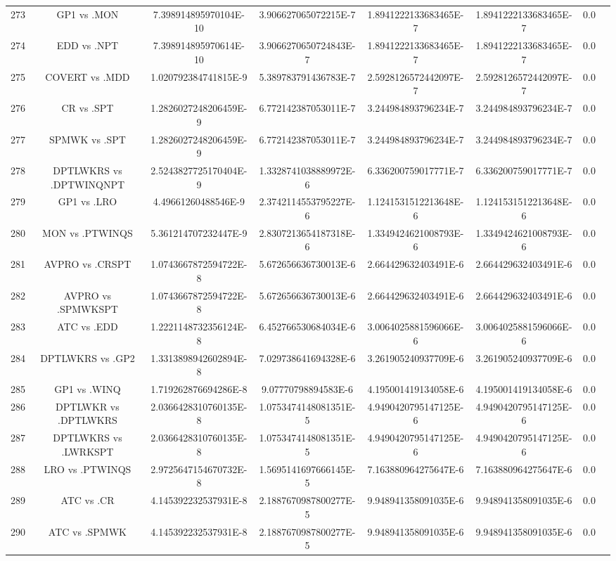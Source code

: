 \documentclass[a3paper,10pt]{article}
\begin{document}
\begin{table}[!htp]
\begin{tabular}{cccccccc}
273&GP1 vs .MON&7.398914895970104E-10&3.906627065072215E-7&1.8941222133683465E-7&1.8941222133683465E-7&0.0\\
274&EDD vs .NPT&7.398914895970614E-10&3.9066270650724843E-7&1.8941222133683465E-7&1.8941222133683465E-7&0.0\\
275&COVERT vs .MDD&1.020792384741815E-9&5.389783791436783E-7&2.5928126572442097E-7&2.5928126572442097E-7&0.0\\
276&CR vs .SPT&1.2826027248206459E-9&6.772142387053011E-7&3.244984893796234E-7&3.244984893796234E-7&0.0\\
277&SPMWK vs .SPT&1.2826027248206459E-9&6.772142387053011E-7&3.244984893796234E-7&3.244984893796234E-7&0.0\\
278&DPTLWKRS vs .DPTWINQNPT&2.5243827725170404E-9&1.3328741038889972E-6&6.336200759017771E-7&6.336200759017771E-7&0.0\\
279&GP1 vs .LRO&4.49661260488546E-9&2.3742114553795227E-6&1.1241531512213648E-6&1.1241531512213648E-6&0.0\\
280&MON vs .PTWINQS&5.361214707232447E-9&2.8307213654187318E-6&1.3349424621008793E-6&1.3349424621008793E-6&0.0\\
281&AVPRO vs .CRSPT&1.0743667872594722E-8&5.672656636730013E-6&2.664429632403491E-6&2.664429632403491E-6&0.0\\
282&AVPRO vs .SPMWKSPT&1.0743667872594722E-8&5.672656636730013E-6&2.664429632403491E-6&2.664429632403491E-6&0.0\\
283&ATC vs .EDD&1.2221148732356124E-8&6.452766530684034E-6&3.0064025881596066E-6&3.0064025881596066E-6&0.0\\
284&DPTLWKRS vs .GP2&1.3313898942602894E-8&7.029738641694328E-6&3.261905240937709E-6&3.261905240937709E-6&0.0\\
285&GP1 vs .WINQ&1.719262876694286E-8&9.07770798894583E-6&4.195001419134058E-6&4.195001419134058E-6&0.0\\
286&DPTLWKR vs .DPTLWKRS&2.0366428310760135E-8&1.0753474148081351E-5&4.9490420795147125E-6&4.9490420795147125E-6&0.0\\
287&DPTLWKRS vs .LWRKSPT&2.0366428310760135E-8&1.0753474148081351E-5&4.9490420795147125E-6&4.9490420795147125E-6&0.0\\
288&LRO vs .PTWINQS&2.9725647154670732E-8&1.5695141697666145E-5&7.163880964275647E-6&7.163880964275647E-6&0.0\\
289&ATC vs .CR&4.145392232537931E-8&2.1887670987800277E-5&9.948941358091035E-6&9.948941358091035E-6&0.0\\
290&ATC vs .SPMWK&4.145392232537931E-8&2.1887670987800277E-5&9.948941358091035E-6&9.948941358091035E-6&0.0\\

\end{tabular}
\end{table}
\end{document}
